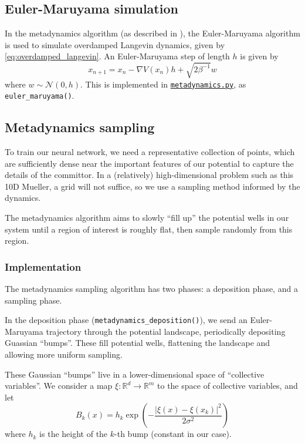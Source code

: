 \documentclass[12pt]{article}
\newcommand{\R}{{\mathbb{R}}}
\newcommand{\abs}[1]{\left\vert #1 \right\vert}
\theoremstyle{ColorTheorem}
\numberwithin{theorem}{section}
\numberwithin{corollary}{section}
\theoremstyle{ColorDefinition}
\theoremstyle{definition}
\theoremstyle{ColorRemark}
\numberwithin{equation}{section}
\begin{document}

\subsection{Euler-Maruyama simulation}
In the metadynamics algorithm (as described in \cite{make_training_data_face}),
the Euler-Maruyama algorithm is used to simulate overdamped Langevin dynamics,
given by \eqref{eq:overdamped_langevin}.
An Euler-Maruyama step of length \(h\) is given by
\begin{equation}\label{eq:overdamped_langevin_euler_maruyama}
  x_{n+1} = x_n - \nabla V(x_n) h + \sqrt{2 \beta^{-1}} w
\end{equation}
where \(w \sim \mathcal N(0, h)\).
This is implemented in 
\href{https://github.com/jrippeon/amsc665project2/blob/main/src/committor/metadynamics.py}{\texttt{metadynamics.py}},
as \texttt{euler\_maruyama()}.


\subsection{Metadynamics sampling}
To train our neural network, we need a representative collection of points,
which are sufficiently dense near the important features of our potential to capture the details of the committor.
In a (relatively) high-dimensional problem such as this 10D Mueller, a grid will not suffice,
so we use a sampling method informed by the dynamics.

The metadynamics algorithm aims to slowly ``fill up'' the potential wells in our system until a region of interest is roughly flat,
then sample randomly from this region.

\subsubsection{Implementation}
The metadynamics sampling algorithm has two phases:
a deposition phase, and a sampling phase.

In the deposition phase (\texttt{metadynamics\_deposition()}),
we send an Euler-Maruyama trajectory through the potential landscape,
periodically depositing Guassian ``bumps''.
These fill potential wells, flattening the landscape and allowing more uniform sampling.

These Gaussian ``bumps'' live in a lower-dimensional space of ``collective variables''.
We consider a map \(\xi : \R^d \to \R^m\) to the space of collective variables,
and let 
\begin{equation}
  B_k(x) = h_k \exp \left(-\frac{\abs{\xi(x)- \xi(x_k)}^2}{2 \sigma^2}\right)
\end{equation}
where \(h_k\) is the height of the \(k\)-th bump (constant in our case).
\end{document}
